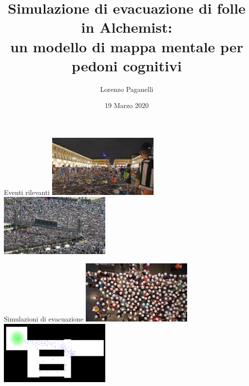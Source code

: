 \documentclass{beamer}
\title[Navigazione cognitiva in Alchemist]{
    Simulazione di evacuazione di folle in Alchemist: \\
    un modello di mappa mentale per pedoni cognitivi
}
\author{Lorenzo Paganelli}
\institute[]
{
    Alma Mater Studiorum $\cdot$ Università di Bologna\\
    Campus di Cesena%
}
\date{19 Marzo 2020}
\begin{document}
\begin{frame}
  \titlepage
\end{frame}



\begin{frame}{Eventi rilevanti}
\hfil\hfil\includegraphics[width=5.5cm]{figures/piazza-san-carlo.jpeg}
\hfil\hfil\includegraphics[width=5.5cm]{figures/hajj.jpg}
\newline
\null
\hfil\hfil{}
\hfil\hfil{}
\newline
\null
\hfil\hfil{}
\hfil\hfil{}
\end{frame}

\begin{frame}{Simulazioni di evacuazione}
\hfil\hfil\includegraphics[width=5.5cm]{figures/real-simulation.jpg}
\hfil\hfil\includegraphics[width=5.5cm]{figures/computerised-simulation.png}
\newline
\null
\hfil\hfil{}
\hfil\hfil{}
\end{frame}
\end{document}
